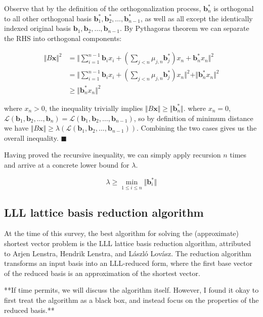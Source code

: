 Observe that by the definition of the orthogonalization process, $\mathbf{b}_n^\ast$ is orthogonal to all other orthogonal basis $\mathbf{b}_1^\ast, \mathbf{b}_2^\ast, \ldots, \mathbf{b}_{n-1}^\ast$, as well as all except the identically indexed original basis $\mathbf{b}_1, \mathbf{b}_2, \ldots, \mathbf{b}_{n-1}$. By Pythagoras theorem we can separate the RHS into orthogonal components:

$$
\begin{aligned}
\Vert B\mathbf{x} \Vert^2 
&= \Vert \sum_{i=1}^{n-1}\mathbf{b}_ix_i + (\sum_{j<n}\mu_{j, n}\mathbf{b}_j^\ast) x_n  + \mathbf{b}_n^\ast x_n\Vert^2 \\
&= \Vert \sum_{i=1}^{n-1}\mathbf{b}_ix_i + (\sum_{j<n}\mu_{j, n}\mathbf{b}_j^\ast) x_n \Vert^2 + \Vert \mathbf{b}_n^\ast x_n \Vert^2 \\
&\geq \Vert \mathbf{b}_n^\ast x_n \Vert^2
\end{aligned}
$$

where $x_n > 0$, the inequality trivially implies $\Vert B\mathbf{x} \Vert \geq \Vert\mathbf{b}_n^\ast\Vert$. where $x_n = 0$, $\mathcal{L}(\mathbf{b}_1, \mathbf{b}_2, \ldots, \mathbf{b}_n) = \mathcal{L}(\mathbf{b}_1, \mathbf{b}_2, \ldots, \mathbf{b}_{n-1})$, so by definition of minimum distance we have $\Vert B\mathbf{x} \Vert \geq \lambda(\mathcal{L}(\mathbf{b}_1, \mathbf{b}_2, \ldots, \mathbf{b}_{n-1}))$. Combining the two cases gives us the overall inequality. $\blacksquare$

Having proved the recursive inequality, we can simply apply recursion $n$ times and arrive at a concrete lower bound for $\lambda$.

$$
\lambda \geq \min_{1 \leq i \leq n} \Vert \mathbf{b}_i^\ast \Vert
$$

\subsection{LLL lattice basis reduction algorithm}
At the time of this survey, the best algorithm for solving the (approximate) shortest vector problem is the LLL lattice basis reduction algorithm, attributed to Arjen Lenstra, Hendrik Lenstra, and László Lovász. The reduction algorithm transforms an input basis into an LLL-reduced form, where the first base vector of the reduced basis is an approximation of the shortest vector.

**If time permits, we will discuss the algorithm itself. However, I found it okay to first treat the algorithm as a black box, and instead focus on the properties of the reduced basis.**

